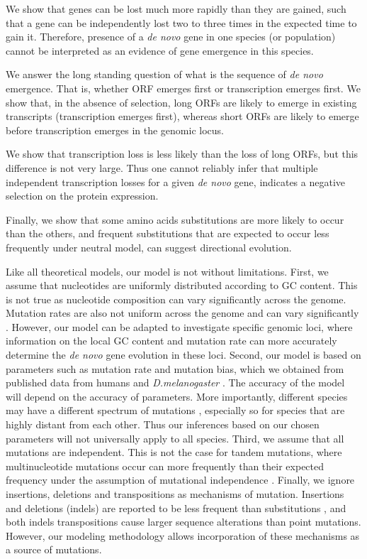 \documentclass[12pt,a4paper]{article}
\begin{document}
We show that genes can be lost much more rapidly than they are gained, such that a gene can be independently lost two to three times in the expected time to gain it. Therefore, presence of a \textit{de novo} gene in one species (or population) cannot be interpreted as an evidence of gene emergence in this species.

We answer the long standing question of what is the sequence of \textit{de novo} emergence. That is, whether ORF emerges first or transcription emerges first. We show that, in the absence of selection, long ORFs are likely to emerge in existing transcripts (transcription emerges first), whereas short ORFs are likely to emerge before transcription emerges in the genomic locus.

We show that transcription loss is less likely than the loss of long ORFs, but this difference is not very large. Thus one cannot reliably infer that multiple independent transcription losses for a given \textit{de novo} gene, indicates a negative selection on the protein expression.

Finally, we show that some amino acids substitutions are more likely to occur than the others, and frequent  substitutions that are expected to occur less frequently under neutral model, can suggest directional evolution. 

Like all theoretical models, our model is not without limitations. First, we assume that nucleotides are uniformly distributed according to GC content. This is not true as nucleotide composition can vary significantly across the genome. Mutation rates are also not uniform across the genome and can vary significantly \citep{mutbiasArabidopsis}. However, our model can be adapted to investigate specific genomic loci, where information on the local GC content and mutation rate can more accurately determine the \textit{de novo} gene evolution in these loci. Second, our model is based on parameters such as mutation rate and mutation bias, which we obtained from published data from humans and \textit{D.melanogaster} \citep{humanmutrate,drosophilamutrate}. The accuracy of the model will depend on the accuracy of parameters. More importantly, different species may have a different spectrum of mutations \citep{joshmutbias}, especially so for species that are highly distant from each other. Thus our inferences based on our chosen parameters will not universally apply to all species. Third, we assume that all mutations are independent. This is not the case for tandem mutations, where multinucleotide mutations occur can more frequently than their expected frequency under the assumption of mutational independence \citep{MNM}. Finally, we ignore insertions, deletions and transpositions as mechanisms of mutation. Insertions and deletions (indels) are reported to be less frequent than substitutions \citep{drosophilamutrate}, and both indels transpositions cause larger sequence alterations than point mutations. However, our modeling methodology allows incorporation of these mechanisms as a source of mutations. 
\end{document}
